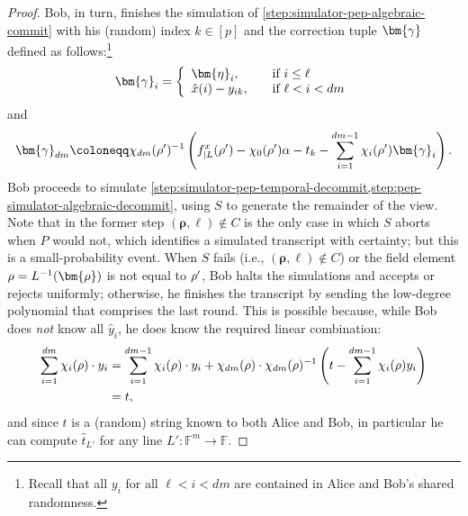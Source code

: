 \documentclass[10pt,a4paper]{article}
\theoremstyle{definition}
\newcommand{\field}{\mathbb{F}}
\newcommand{\pcommitlength}{p}
\newcommand{\pcommitstring}{y}
\newcommand{\dimension}{m}
\newcommand{\degree}{d}
\newcommand{\fingerprinttuple}{\bm{\rho}}
\renewcommand{\line}{L}
\def\fe#1{
    \ifnum#1=1
        \alpha
    \else
    \ifnum#1=2
        \beta
    \else
    \ifnum#1=3
        \gamma
    \fi\fi\fi
}
\def\rfe#1{
    \ifnum#1=1
        \rho
    \else
    \ifnum#1=2
        \sigma
    \else
    \fi\fi
}
\begin{document}
\begin{proof}
    Bob, in turn, finishes the simulation of \cref{step:simulator-pep-algebraic-commit} with his (random) index $k \in [\pcommitlength]$ and the correction tuple $\bm{\fe3}$ defined as follows:\footnote{Recall that all $\pcommitstring_i$ for all $\ell < i < \degree\dimension$ are contained in Alice and Bob's shared randomness.}
    \begin{equation*}
        \bm{\fe3}_i = \left\{\begin{array}{ll}\bm{\eta}_i, & \text{if } i \leq \ell \\ \hat x(i) - \pcommitstring_{ik},\quad & \text{if } \ell < i < \degree\dimension\end{array}\right.
    \end{equation*}
    and
    \begin{equation*}
        \bm{\fe3}_{\degree\dimension} \coloneqq \chi_{\degree\dimension}(\rfe1')^{-1} \left(f^x_{|\line}(\rfe1') - \chi_0(\rfe1') \fe1 - t_k - \sum_{i = 1}^{\degree\dimension - 1} \chi_i(\rfe1') \bm{\fe3}_i\right).
    \end{equation*}
    Bob proceeds to simulate \cref{step:simulator-pep-temporal-decommit,step:pep-simulator-algebraic-decommit}, using $S$ to generate the remainder of the view. Note that in the former step $(\fingerprinttuple, \ell) \notin C$ is the only case in which $S$ aborts when $P$ would not, which identifies a simulated transcript with certainty; but this is a small-probability event. When $S$ fails (i.e., $(\fingerprinttuple, \ell) \notin C$) or the field element $\rfe1 = \line^{-1}(\fingerprinttuple)$ is not equal to $\rfe1'$, Bob halts the simulations and accepts or rejects uniformly; otherwise, he finishes the transcript by sending the low-degree polynomial that comprises the last round. This is possible because, while Bob does \emph{not} know all $\hat \pcommitstring_i$, he does know the required linear combination:
    \begin{align*}
        \sum_{i = 1}^{\degree\dimension} \chi_i(\rfe1) \cdot \pcommitstring_i &= \sum_{i = 1}^{\degree\dimension - 1} \chi_i(\rfe1) \cdot \pcommitstring_i + \chi_{\degree\dimension}(\rfe1) \cdot \chi_{\degree\dimension}(\rfe1)^{-1} \left(t - \sum_{i = 1}^{\degree\dimension - 1} \chi_i(\rfe1) \pcommitstring_i\right)\\
        &= t,
    \end{align*}
    and since $t$ is a (random) string known to both Alice and Bob, in particular he can compute $\hat t_{\line'}$ for any line $\line': \field^\dimension \to \field$.
    

\end{proof}
\end{document}
